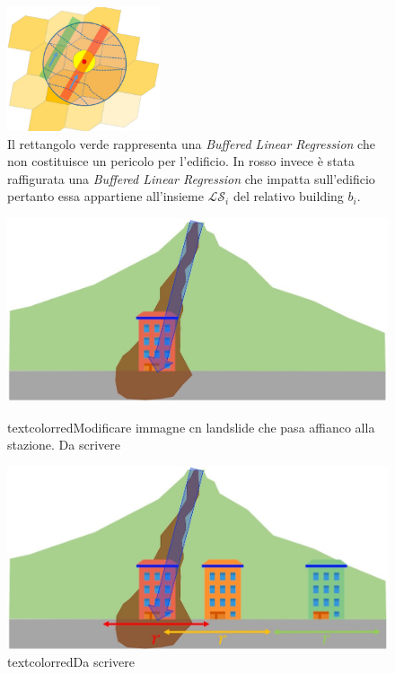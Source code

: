 \begin{enumerate}
	\begin{figure}[h]
		\centering
		\includegraphics[width=0.4\textwidth]{images/landslides}
		\caption{Il rettangolo verde rappresenta una \textit{Buffered Linear Regression} che non costituisce un pericolo per l'edificio. In rosso invece è stata raffigurata una \textit{Buffered Linear Regression} che impatta sull'edificio pertanto essa appartiene all'insieme $\mathcal{LS}_i$ del relativo building $b_i$.}
	\label{landslides}
	\end{figure}
	

\begin{figure}[h]
	\hspace{0.05\linewidth}
	\begin{minipage}[t]{0.4\linewidth}
		\centering
		\includegraphics[width=\textwidth]{images/landslide2}
		\caption{textcolor{red}{Modificare immagne cn landslide che pasa affianco alla stazione. Da scrivere}}
		\label{landslide2}
	\end{minipage}
	\hspace{0.05\linewidth}
	\begin{minipage}[t]{0.4\linewidth}
		\centering
		\includegraphics[width=\textwidth]{images/landslide3}
			\caption{textcolor{red}{Da scrivere}}
		\label{landslide3}
	\end{minipage}
\end{figure}
	
\end{enumerate}

